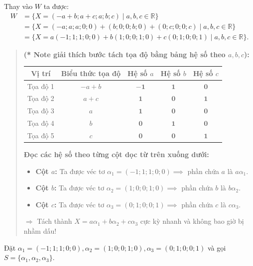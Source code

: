 \documentclass[12pt,a4paper]{article}
\newcommand{\R}{\mathbb{R}}
\begin{document}
Thay vào $W$ ta được:
\begin{align*}
W &= \{ X = (-a+b; a+c; a; b; c) \mid a, b, c \in \R \} \\
  &= \{ X = (-a; a; a; 0; 0) + (b; 0; 0; b; 0) + (0; c; 0; 0; c) \mid a, b, c \in \R \} \\
  &= \{ X = a(-1; 1; 1; 0; 0) + b(1; 0; 0; 1; 0) + c(0; 1; 0; 0; 1) \mid a, b, c \in \R \}.
\end{align*}
\begin{quote}
\small\textbf{(* Note giải thích bước tách tọa độ bằng bảng hệ số theo $a, b, c$):}
\begin{center}
\renewcommand{\arraystretch}{1.15}
\setlength{\tabcolsep}{6pt}
\footnotesize
\begin{tabular}{|c|c|c|c|c|}
\hline
\textbf{Vị trí} & \textbf{Biểu thức tọa độ} & \textbf{Hệ số $a$} & \textbf{Hệ số $b$} & \textbf{Hệ số $c$} \\
\hline
Tọa độ 1 & $-a + b$ & $\mathbf{-1}$ & $\mathbf{1}$ & $\mathbf{0}$ \\
\hline
Tọa độ 2 & $a + c$ & $\mathbf{1}$ & $\mathbf{0}$ & $\mathbf{1}$ \\
\hline
Tọa độ 3 & $a$ & $\mathbf{1}$ & $\mathbf{0}$ & $\mathbf{0}$ \\
\hline
Tọa độ 4 & $b$ & $\mathbf{0}$ & $\mathbf{1}$ & $\mathbf{0}$ \\
\hline
Tọa độ 5 & $c$ & $\mathbf{0}$ & $\mathbf{0}$ & $\mathbf{1}$ \\
\hline
\end{tabular}
\end{center}
\textbf{Đọc các hệ số theo từng cột dọc từ trên xuống dưới:}
\begin{itemize}[noitemsep,topsep=2pt]
\item \textbf{Cột $a$:} Ta được véc tơ $\alpha_1 = (-1; 1; 1; 0; 0) \implies$ phần chứa $a$ là $a\alpha_1$.
\item \textbf{Cột $b$:} Ta được véc tơ $\alpha_2 = (1; 0; 0; 1; 0) \implies$ phần chứa $b$ là $b\alpha_2$.
\item \textbf{Cột $c$:} Ta được véc tơ $\alpha_3 = (0; 1; 0; 0; 1) \implies$ phần chứa $c$ là $c\alpha_3$.
\end{itemize}
$\Rightarrow$ Tách thành $X = a\alpha_1 + b\alpha_2 + c\alpha_3$ cực kỳ nhanh và không bao giờ bị nhầm dấu!
\end{quote}

Đặt $\alpha_1 = (-1; 1; 1; 0; 0), \alpha_2 = (1; 0; 0; 1; 0), \alpha_3 = (0; 1; 0; 0; 1)$ và gọi $S = \{ \alpha_1, \alpha_2, \alpha_3 \}$.
\end{document}
